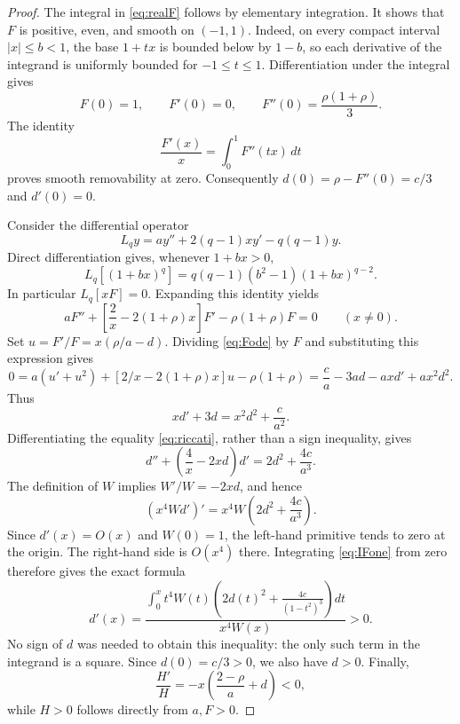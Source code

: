\documentclass[11pt,a4paper]{amsart}
\numberwithin{equation}{section}
\theoremstyle{remark}
\begin{document}
\begin{proof}
The integral in \eqref{eq:realF} follows by elementary integration.
It shows that $F$ is positive, even, and smooth on $(-1,1)$.
Indeed, on every compact interval $|x|\le b<1$, the base $1+tx$
is bounded below by $1-b$, so each derivative of the integrand is
uniformly bounded for $-1\le t\le1$. Differentiation under the
integral gives
\[
 F(0)=1,\qquad F'(0)=0,\qquad F''(0)=\frac{\rho(1+\rho)}3.
\]
The identity
\[
 \frac{F'(x)}x=\int_0^1 F''(tx)\,dt
\]
proves smooth removability at zero. Consequently
$d(0)=\rho-F''(0)=c/3$ and $d'(0)=0$.

Consider the differential operator
\[
 L_qy=a y''+2(q-1)xy'-q(q-1)y.
\]
Direct differentiation gives, whenever $1+bx>0$,
\begin{equation}
 L_q[(1+bx)^q]=q(q-1)(b^2-1)(1+bx)^{q-2}.
 \label{eq:poweroperator}
\end{equation}
In particular $L_q[xF]=0$. Expanding this identity yields
\begin{equation}
 aF''+\left[\frac2x-2(1+\rho)x\right]F'
       -\rho(1+\rho)F=0\qquad(x\ne0).
 \label{eq:Fode}
\end{equation}
Set $u=F'/F=x(\rho/a-d)$. Dividing \eqref{eq:Fode} by $F$ and
substituting this expression gives
\[
 0=a(u'+u^2)+[2/x-2(1+\rho)x]u-\rho(1+\rho)
   =\frac ca-3ad-axd'+ax^2d^2.
\]
Thus
\begin{equation}
 xd'+3d=x^2d^2+\frac c{a^2}.
 \label{eq:riccati}
\end{equation}
Differentiating the equality \eqref{eq:riccati}, rather than a sign
inequality, gives
\[
 d''+\left(\frac4x-2xd\right)d'=2d^2+\frac{4c}{a^3}.
\]
The definition of $W$ implies $W'/W=-2xd$, and hence
\begin{equation}
 (x^4Wd')'=x^4W\left(2d^2+\frac{4c}{a^3}\right).
 \label{eq:IFone}
\end{equation}
Since $d'(x)=O(x)$ and $W(0)=1$, the left-hand primitive tends to
zero at the origin. The right-hand side is $O(x^4)$ there. Integrating
\eqref{eq:IFone} from zero therefore gives the exact formula
\begin{equation}
 d'(x)=\frac{\displaystyle\int_0^x t^4W(t)
       \left(2d(t)^2+\frac{4c}{(1-t^2)^3}\right)dt}
       {x^4W(x)}>0.
 \label{eq:positiveD}
\end{equation}
No sign of $d$ was needed to obtain this inequality: the only such
term in the integrand is a square. Since $d(0)=c/3>0$, we also have
$d>0$. Finally,
\begin{equation}
 \frac{H'}H=-x\left(\frac{2-\rho}{a}+d\right)<0,
 \label{eq:Hdecrease}
\end{equation}
while $H>0$ follows directly from $a,F>0$.
\end{proof}
\end{document}
